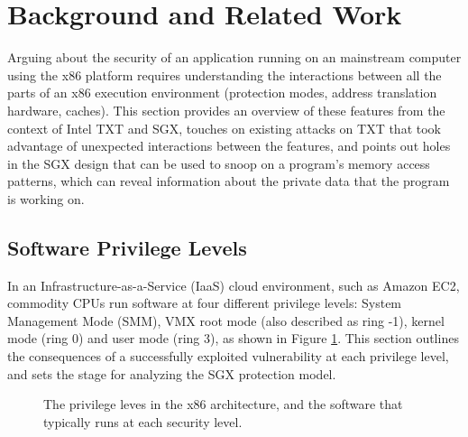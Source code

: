 \section{Background and Related Work}
\label{sec:background}

Arguing about the security of an application running on an mainstream computer
using the x86 platform requires understanding the interactions between
all the parts of an x86 execution environment (protection modes, address
translation hardware, caches). This section provides an overview of these
features from the context of Intel TXT and SGX, touches on existing attacks on
TXT that took advantage of unexpected interactions between the features, and
points out holes in the SGX design that can be used to snoop on a program's
memory access patterns, which can reveal information about the private data
that the program is working on.


\subsection{Software Privilege Levels}
\label{sec:rings}

In an Infrastructure-as-a-Service (IaaS) cloud environment, such as Amazon EC2,
commodity CPUs run software at four different privilege levels: System
Management Mode (SMM), VMX root mode (also described as ring -1), kernel mode
(ring 0) and user mode (ring 3), as shown in Figure \ref{fig:cpu_rings}. This
section outlines the consequences of a successfully exploited vulnerability at
each privilege level, and sets the stage for analyzing the SGX protection
model.

\begin{figure}[hbtp]
  \caption{
    The privilege leves in the x86 architecture, and the software that
    typically runs at each security level.
  }
  \label{fig:cpu_rings}
\end{figure}

